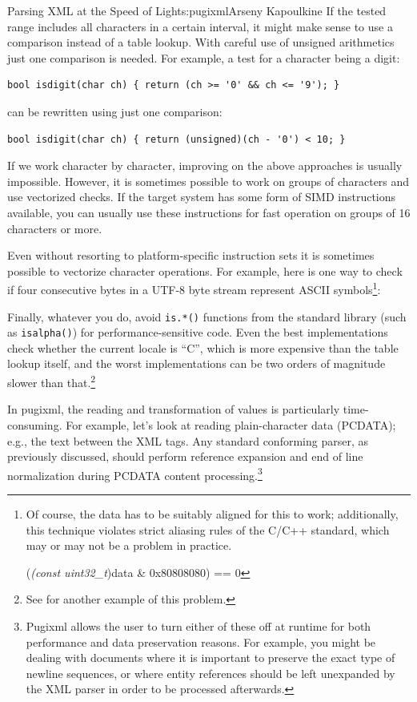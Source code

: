\begin{aosachapter}{Parsing XML at the Speed of Light}{s:pugixml}{Arseny Kapoulkine}
If the tested range includes all characters in a certain interval, it
might make sense to use a comparison instead of a table lookup. With
careful use of unsigned arithmetics just one comparison is needed. For
example, a test for a character being a digit:

\begin{verbatim}
bool isdigit(char ch) { return (ch >= '0' && ch <= '9'); }
\end{verbatim}

\noindent can be rewritten using just one comparison:

\begin{verbatim}
bool isdigit(char ch) { return (unsigned)(ch - '0') < 10; }
\end{verbatim}

If we work character by character, improving on the above approaches is
usually impossible. However, it is sometimes possible to work on groups
of characters and use vectorized checks. If the target system has some
form of SIMD instructions available, you can usually use these
instructions for fast operation on groups of 16 characters or more.

Even without resorting to platform-specific instruction sets it is
sometimes possible to vectorize character operations. For example, here
is one way to check if four consecutive bytes in a UTF-8 byte stream
represent ASCII symbols\footnote{Of course, the data has to be suitably
  aligned for this to work; additionally, this technique violates strict
  aliasing rules of the C/C++ standard, which may or may not be a
  problem in practice.

  (\emph{(const uint32\_t})data \& 0x80808080) == 0}:

Finally, whatever you do, avoid \texttt{is.*()} functions from the
standard library (such as \texttt{isalpha()}) for performance-sensitive
code. Even the best implementations check whether the current locale is
``C'', which is more expensive than the table lookup itself, and the
worst implementations can be two orders of magnitude slower than
that.\footnote{See  for another example of this
  problem.}


In pugixml, the reading and transformation of values is particularly
time-consuming. For example, let's look at reading plain-character data
(PCDATA); e.g., the text between the XML tags. Any standard conforming
parser, as previously discussed, should perform reference expansion and
end of line normalization during PCDATA content processing.\footnote{Pugixml
  allows the user to turn either of these off at runtime for both
  performance and data preservation reasons. For example, you might be
  dealing with documents where it is important to preserve the exact
  type of newline sequences, or where entity references should be left
  unexpanded by the XML parser in order to be processed afterwards.}


\end{aosachapter}
